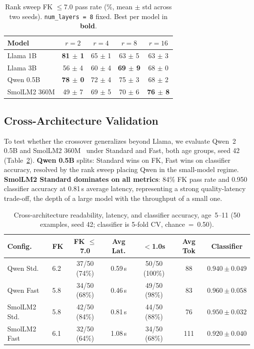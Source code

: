 \documentclass[pdflatex,sn-mathphys-num]{sn-jnl}%
\begin{document}
\begin{table}[!h]
  \centering
  \caption{Rank sweep FK $\leq 7.0$ pass rate (\%, mean $\pm$ std across two seeds). \texttt{num\_layers~=~8} fixed. Best per model in \textbf{bold}.}
  \label{tab:ranksweep}
  \small
  \begin{tabular}{@{}lcccc@{}}
    \toprule
    Model        & $r=2$               & $r=4$      & $r=8$               & $r=16$ \\
    \midrule
    Llama 1B     & \textbf{81 $\pm$ 1} & 65 $\pm$ 1 & 63 $\pm$ 5          & 63 $\pm$ 3 \\
    Llama 3B     & 56 $\pm$ 4          & 60 $\pm$ 4 & \textbf{69 $\pm$ 9} & 68 $\pm$ 0 \\
    Qwen 0.5B    & \textbf{78 $\pm$ 0} & 72 $\pm$ 4 & 75 $\pm$ 3          & 68 $\pm$ 2 \\
    SmolLM2 360M & 49 $\pm$ 7          & 69 $\pm$ 5 & 70 $\pm$ 6          & \textbf{76 $\pm$ 8} \\
    \bottomrule
  \end{tabular}
\end{table}

\subsection{Cross-Architecture Validation}\label{sec:crossarch}

To test whether the crossover generalizes beyond Llama, we evaluate Qwen~2 0.5B and SmolLM2 360M~\cite{allal2025smollm2} under Standard and Fast, both age groups, seed 42 (Table~\ref{tab:crossarch}). \textbf{Qwen 0.5B} splits: Standard wins on FK, Fast wins on classifier accuracy, resolved by the rank sweep placing Qwen in the small-model regime. \textbf{SmolLM2 Standard dominates on all metrics}: 84\% FK pass rate and 0.950 classifier accuracy at 0.81\,s average latency, representing a strong quality-latency trade-off, the depth of a large model with the throughput of a small one.

\begin{table}[!h]
  \centering
  \caption{Cross-architecture readability, latency, and classifier accuracy, age~5--11 (50 examples, seed 42; classifier is 5-fold CV, chance~=~0.50).}
  \label{tab:crossarch}
  \scriptsize
  \setlength{\tabcolsep}{3pt}
  \begin{tabular}{@{}llccccc@{}}
    \toprule
    Config. & FK & FK $\leq$7.0 & Avg Lat. & $<$1.0s & Avg Tok & Classifier \\
    \midrule
    Qwen Std.    & 6.2 & 37/50 (74\%) & 0.59\,s & 50/50 (100\%) & 88  & $0.940 \pm 0.049$ \\
    Qwen Fast    & 5.8 & 34/50 (68\%) & 0.46\,s & 49/50 (98\%)  & 83  & $0.960 \pm 0.058$ \\
    SmolLM2 Std. & 5.8 & 42/50 (84\%) & 0.81\,s & 44/50 (88\%)  & 76  & $0.950 \pm 0.032$ \\
    SmolLM2 Fast & 6.1 & 32/50 (64\%) & 1.08\,s & 34/50 (68\%)  & 111 & $0.920 \pm 0.040$ \\
    \bottomrule
  \end{tabular}
\end{table}
\end{document}
